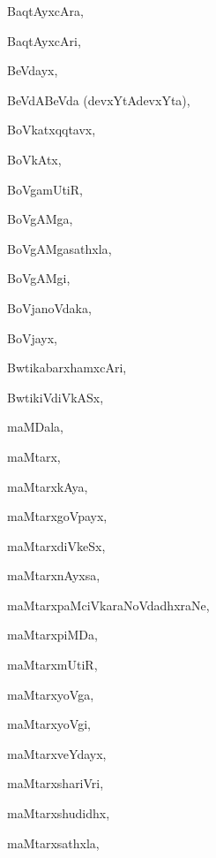 \begin{multicols}{3}
{\noindent
{BaqtAyxcAra}, \pageref{BaqtAyxcAra}

\noindent
{BaqtAyxcAri}, \pageref{BaqtAyxcAri}

\noindent
{BeVdayx}, \pageref{BeVdayx}

\noindent
{BeVdABeVda (devxYtAdevxYta)}, \pageref{BeVdABeVdadevxYtAdevxYta}

\noindent
{BoVkatxqqtavx}, \pageref{BoVkatxqqtavx}

\noindent
{BoVkAtx}, \pageref{BoVkAtx}

\noindent
{BoVgamUtiR}, \pageref{BoVgamUtiR}

\noindent
{BoVgAMga}, \pageref{BoVgAMga}

\noindent
{BoVgAMgasathxla}, \pageref{BoVgAMgasathxla}

\noindent
{BoVgAMgi}, \pageref{BoVgAMgi}

\noindent
{BoVjanoVdaka}, \pageref{BoVjanoVdaka}

\noindent
{BoVjayx}, \pageref{BoVjayx}

\noindent
{BwtikabarxhamxcAri}, \pageref{BwtikabarxhamxcAri}

\noindent
{BwtikiVdiVkASx}, \pageref{BwtikiVdiVkASx}

\noindent
{maMDala}, \pageref{maMDala}

\noindent
{maMtarx}, \pageref{maMtarx}

\noindent
{maMtarxkAya}, \pageref{maMtarxkAya}

\noindent
{maMtarxgoVpayx}, \pageref{maMtarxgoVpayx}

\noindent
{maMtarxdiVkeSx}, \pageref{maMtarxdiVkeSx}

\noindent
{maMtarxnAyxsa}, \pageref{maMtarxnAyxsa}

\noindent
{maMtarxpaMciVkaraNoVdadhxraNe}, \pageref{maMtarxpaMciVkaraNoVdadhxraNe}

\noindent
{maMtarxpiMDa}, \pageref{maMtarxpiMDa}

\noindent
{maMtarxmUtiR}, \pageref{maMtarxmUtiR}

\noindent
{maMtarxyoVga}, \pageref{maMtarxyoVga}

\noindent
{maMtarxyoVgi}, \pageref{maMtarxyoVgi}

\noindent
{maMtarxveYdayx}, \pageref{maMtarxveYdayx}

\noindent
{maMtarxshariVri}, \pageref{maMtarxshariVri}

\noindent
{maMtarxshudidhx}, \pageref{maMtarxshudidhx}

\noindent
{maMtarxsathxla}, \pageref{maMtarxsathxla}

}
\end{multicols}
